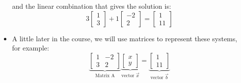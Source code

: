 \begin{itemize}
\begin{center}
    \end{center}
    and the linear combination that gives the solution is:
    \begin{equation}
        3\begin{bmatrix}
            1\\3
        \end{bmatrix}
        +1\begin{bmatrix}
        -2\\2
        \end{bmatrix}=\begin{bmatrix}
            1\\11
        \end{bmatrix}
        \label{eq:}
    \end{equation}
    \item A little later in the course, we will use matrices to represent these systems, for example:
    \begin{equation}
        \underbrace{\begin{bmatrix}
            1&-2\\3&2
        \end{bmatrix}}_\text{Matrix A}\underbrace{\begin{bmatrix}
            x\\y
        \end{bmatrix}}_{\text{vector } \vec{x}}=\underbrace{\begin{bmatrix}
            1\\11
        \end{bmatrix}}_{\text{vector }\vec{b}}
    \end{equation}

\end{itemize}
